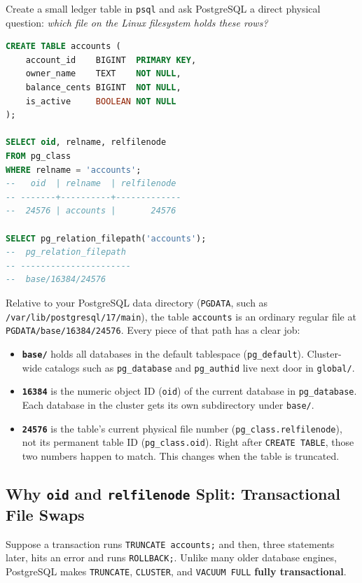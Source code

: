 Create a small ledger table in \texttt{psql} and ask PostgreSQL a direct physical question: \emph{which file on the Linux filesystem holds these rows?}

\begin{lstlisting}[language=SQL]
CREATE TABLE accounts (
    account_id    BIGINT  PRIMARY KEY,
    owner_name    TEXT    NOT NULL,
    balance_cents BIGINT  NOT NULL,
    is_active     BOOLEAN NOT NULL
);

SELECT oid, relname, relfilenode
FROM pg_class
WHERE relname = 'accounts';
--   oid  | relname  | relfilenode
-- -------+----------+-------------
--  24576 | accounts |       24576

SELECT pg_relation_filepath('accounts');
--  pg_relation_filepath
-- ----------------------
--  base/16384/24576
\end{lstlisting}

Relative to your PostgreSQL data directory (\texttt{PGDATA}, such as \texttt{/var/lib/postgresql/17/main}), the table \texttt{accounts} is an ordinary regular file at \texttt{PGDATA/base/16384/24576}. Every piece of that path has a clear job:
\begin{itemize}
  \item \textbf{\texttt{base/}} holds all databases in the default tablespace (\texttt{pg\_default}). Cluster-wide catalogs such as \texttt{pg\_database} and \texttt{pg\_authid} live next door in \texttt{global/}.
  \item \textbf{\texttt{16384}} is the numeric object ID (\texttt{oid}) of the current database in \texttt{pg\_database}. Each database in the cluster gets its own subdirectory under \texttt{base/}.
  \item \textbf{\texttt{24576}} is the table's current physical file number (\texttt{pg\_class.relfilenode}), not its permanent table ID (\texttt{pg\_class.oid}). Right after \texttt{CREATE TABLE}, those two numbers happen to match. This changes when the table is truncated.
\end{itemize}

\subsection{Why \texttt{oid} and \texttt{relfilenode} Split: Transactional File Swaps}

Suppose a transaction runs \texttt{TRUNCATE accounts;} and then, three statements later, hits an error and runs \texttt{ROLLBACK;}. Unlike many older database engines, PostgreSQL makes \texttt{TRUNCATE}, \texttt{CLUSTER}, and \texttt{VACUUM FULL} \textbf{fully transactional}.


